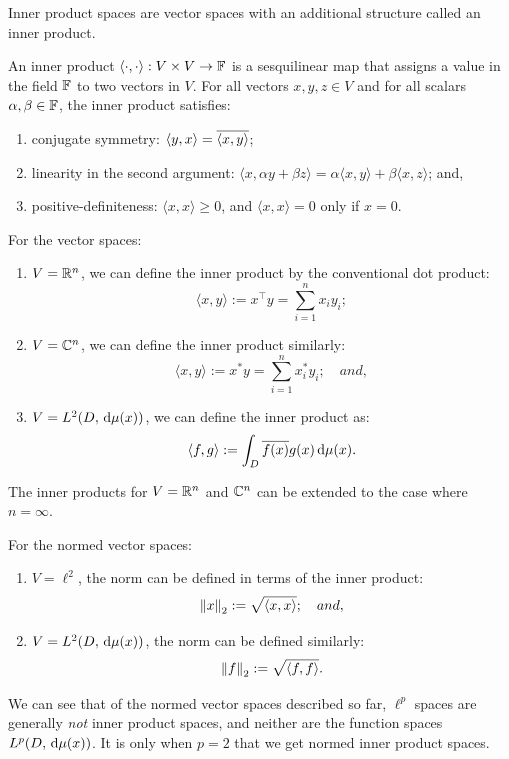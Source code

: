 Inner product spaces are vector spaces with an additional structure called an inner product.
\begin{definition}
An inner product $\langle\cdot,\cdot\rangle: V\times V\to\mathbb{F}$ is a sesquilinear map that assigns a value in the field $\mathbb{F}$ to two vectors in $V$. For all vectors $x,y,z\in V$ and for all scalars $\alpha,\beta\in\mathbb{F}$, the inner product satisfies:
\begin{enumerate}
\item conjugate symmetry: $\langle y,x\rangle = \overline{\langle x,y\rangle}$;
\item linearity in the second argument: $\langle x, \alpha y+\beta z\rangle = \alpha\langle x,y\rangle + \beta\langle x,z\rangle$; and,
\item positive-definiteness: $\langle x,x\rangle \ge 0$, and $\langle x,x\rangle = 0$ only if $x = 0$.
\end{enumerate}
\end{definition}

\begin{example}
For the vector spaces:
\begin{enumerate}
\item $V = \mathbb{R}^n$, we can define the inner product by the conventional dot product:
\[
\langle x,y \rangle := x^\top y = \sum_{i=1}^n x_iy_i;
\]
\item $V = \mathbb{C}^n$, we can define the inner product similarly:
\[
\langle x,y \rangle := x^* y = \sum_{i=1}^n x_i^*y_i;\quad and,
\]
\item $V = L^2(D,{\rm\,d}\mu(x))$, we can define the inner product as:
\[
\langle f,g\rangle := \int_D\overline{f(x)}g(x){\rm\,d}\mu(x).
\]
\end{enumerate}
\end{example}
The inner products for $V = \mathbb{R}^n$ and $\mathbb{C}^n$ can be extended to the case where $n=\infty$.

\begin{example} For the normed vector spaces:
\begin{enumerate}
\item $V = \ell^2$, the norm can be defined in terms of the inner product:
\[
\left\|{x}\right\|_2 := \sqrt{\langle x,x\rangle};\quad and,
\]
\item $V = L^2(D,{\rm\,d}\mu(x))$, the norm can be defined similarly:
\[
\left\|{f}\right\|_2 := \sqrt{\langle f,f\rangle}.
\]
\end{enumerate}
\end{example}

We can see that of the normed vector spaces described so far, $\ell^p$ spaces are generally {\em not} inner product spaces, and neither are the function spaces $L^p(D,{\rm\,d}\mu(x))$. It is only when $p=2$ that we get normed inner product spaces.

